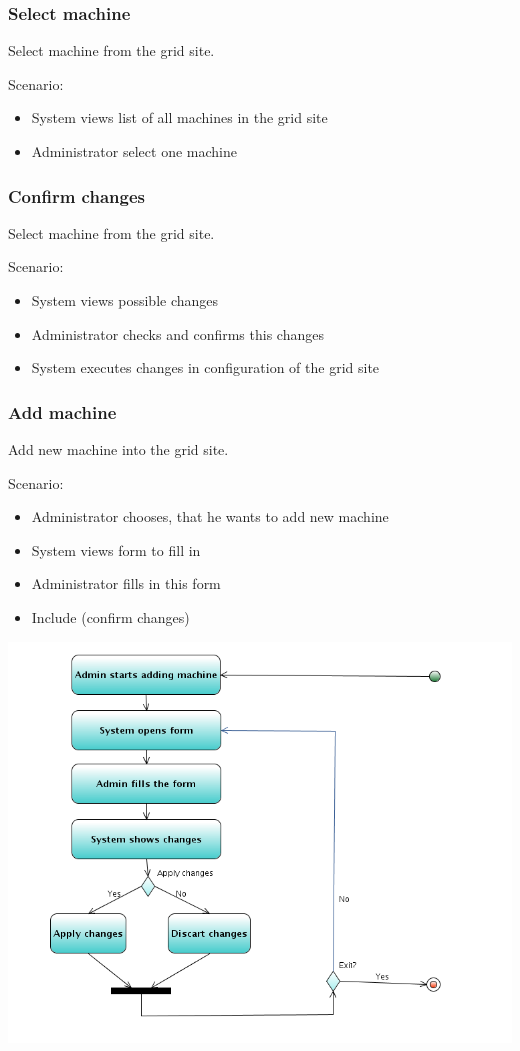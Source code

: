 \documentclass[12pt]{article}
\begin{document}
\subsubsection{Select machine}
Select machine from the grid site.

Scenario:
\begin{itemize}
\item{System views list of all machines in the grid site}
\item{Administrator select one machine}
\end{itemize}

\subsubsection{Confirm changes}
Select machine from the grid site.

Scenario:
\begin{itemize}
\item{System views possible changes}
\item{Administrator checks and confirms this changes}
\item{System executes changes in configuration of the grid site}
\end{itemize}

\subsubsection{Add machine}
Add new machine into the grid site.

Scenario:
\begin{itemize}
\item{Administrator chooses, that he wants to add new machine}
\item{System views form to fill in}
\item{Administrator fills in this form}
\item{Include (confirm changes)}
\end{itemize}

\includegraphics[width=\linewidth]{AddM.png}
\end{document}
